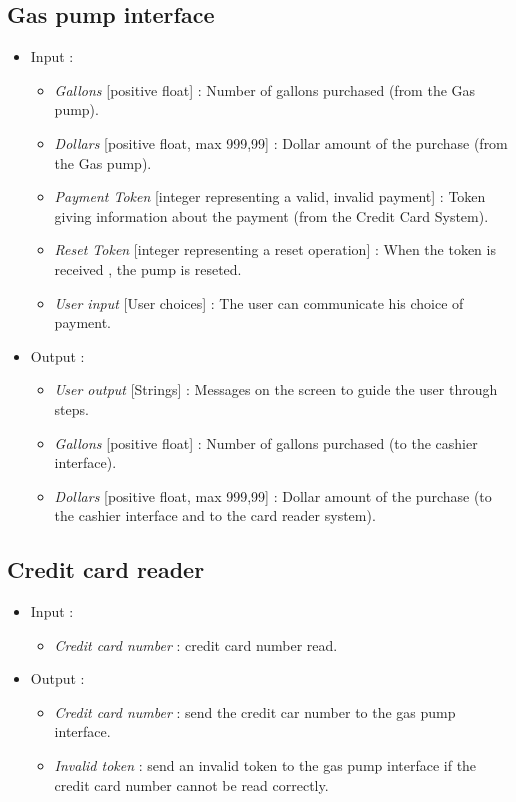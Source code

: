 \documentclass[11pt, a4paper]{article}
\newcommand{\data}[1]{\textit{#1}}
\begin{document}
\bigskip

\subsection{Gas pump interface}

\begin{itemize}
\item Input :
		\begin{itemize}
    \item \data{Gallons} [positive float] : Number of gallons purchased (from the Gas pump).
    \item \data{Dollars} [positive float, max 999,99] : Dollar amount of the purchase (from the Gas pump).
    \item \data{Payment Token} [integer representing a {valid, invalid} payment] : Token giving information about the payment (from the Credit Card System).
    \item \data{Reset Token} [integer representing a reset operation] : When the token is received , the pump is reseted.
    \item \data{User input} [User choices] : The user can communicate his choice of payment.
    \end{itemize}

\item Output :
		\begin{itemize}
		\item \data{User output} [Strings] : Messages on the screen to guide the user through steps.
    \item \data{Gallons} [positive float] : Number of gallons purchased (to the cashier interface).
    \item \data{Dollars} [positive float, max 999,99] : Dollar amount of the purchase (to the cashier interface and to the card reader system).
		\end{itemize}
\end{itemize}



\newpage
\subsection{Credit card reader}

\begin{itemize}
\item Input :
		\begin{itemize}
		\item \data{Credit card number} : credit card number read.
		\end{itemize}

\item Output :
		\begin{itemize}
		\item \data{Credit card number} : send the credit car number to the gas pump interface.
		\item \data{Invalid token} : send an invalid token to the gas pump interface if the credit card number cannot be read correctly.
		\end{itemize}
\end{itemize}
\end{document}
